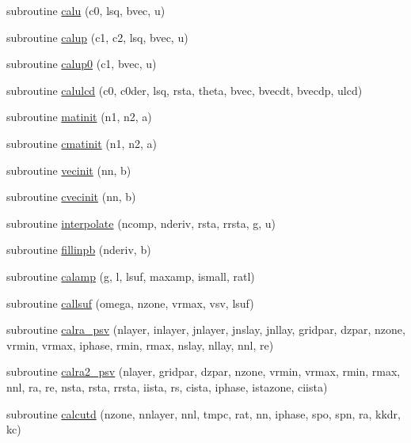 \begin{DoxyCompactItemize}
\item 
subroutine \hyperlink{others_8f90_a992c21fefe0ce478647b40e5f006b774}{calu} (c0, lsq, bvec, u)
\item 
subroutine \hyperlink{others_8f90_a99ae4bc0ae6223584eb57243cd067d61}{calup} (c1, c2, lsq, bvec, u)
\item 
subroutine \hyperlink{others_8f90_a5e69a70004b19a3ce959aeeaacedb7af}{calup0} (c1, bvec, u)
\item 
subroutine \hyperlink{others_8f90_a2c46c4d3e0d98e8debb55c877844653c}{calulcd} (c0, c0der, lsq, rsta, theta, bvec, bvecdt, bvecdp, ulcd)
\item 
subroutine \hyperlink{others_8f90_aac4432f4304590f9396cc90abcb542d6}{matinit} (n1, n2, a)
\item 
subroutine \hyperlink{others_8f90_afd76633abb3514d3a15d05fd1fb36be1}{cmatinit} (n1, n2, a)
\item 
subroutine \hyperlink{others_8f90_adbf33257691107aa55102db74ca86d4f}{vecinit} (nn, b)
\item 
subroutine \hyperlink{others_8f90_a521de3b59b4f0faca506b8782a06c062}{cvecinit} (nn, b)
\item 
subroutine \hyperlink{others_8f90_a04a78632138cfc56c15a28429a22ab7a}{interpolate} (ncomp, nderiv, rsta, rrsta, g, u)
\item 
subroutine \hyperlink{others_8f90_a637acae66901e94f0b90107bdfd2bc22}{fillinpb} (nderiv, b)
\item 
subroutine \hyperlink{others_8f90_a104362b0c91ac4804228b852c39f926f}{calamp} (g, l, lsuf, maxamp, ismall, ratl)
\item 
subroutine \hyperlink{others_8f90_a0121e57fd51bf2812b3d1e5505a203f3}{callsuf} (omega, nzone, vrmax, vsv, lsuf)
\item 
subroutine \hyperlink{others_8f90_a6fc36f8c86ea51976b2e28560845c99d}{calra\-\_\-psv} (nlayer, inlayer, jnlayer, jnslay, jnllay, gridpar, dzpar, nzone, vrmin, vrmax, iphase, rmin, rmax, nslay, nllay, nnl, re)
\item 
subroutine \hyperlink{others_8f90_af7b742feea4be6ab18481899e6303761}{calra2\-\_\-psv} (nlayer, gridpar, dzpar, nzone, vrmin, vrmax, rmin, rmax, nnl, ra, re, nsta, rsta, rrsta, iista, rs, cista, iphase, istazone, ciista)
\item 
subroutine \hyperlink{others_8f90_a80b9a9ef305767e3c16378fd216c5e81}{calcutd} (nzone, nnlayer, nnl, tmpc, rat, nn, iphase, spo, spn, ra, kkdr, kc)
\end{DoxyCompactItemize}


